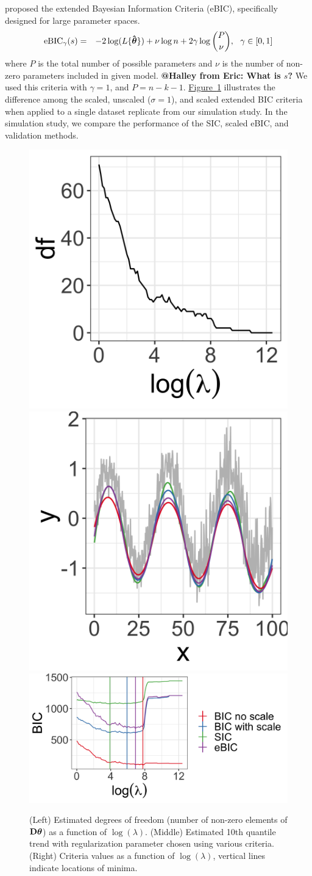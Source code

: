 \documentclass[12pt]{article}
\makeatletter
\newcommand{\Halley}[2]{{\bf {\color{purple}@Halley from #1: #2}}\xspace}
\newcommand{\Fig}[1]{\hyperref[fig:#1]{Figure~\ref*{fig:#1}}} %
\newcommand{\Fig}[1]{{Figure~\ref{fig:#1}}} %
\newcommand{\V}[1]{{\bm{\mathbf{\MakeLowercase{#1}}}}} %
\newcommand{\Vhat}[1]{{\bm{\hat \mathbf{\MakeLowercase{#1}}}}} %
\newcommand{\M}[1]{{\bm{\mathbf{\MakeUppercase{#1}}}}} %
\makeatother
\begin{document}
	\cite{chen2008} proposed the extended Bayesian Information Criteria (eBIC), specifically designed for large parameter spaces.
	\begin{eqnarray*}
	\label{eq:eBIC}
	\mbox{eBIC}_{\gamma}(s) & = & -2\log(L\{\Vhat{\theta}\}) + \nu\log n  + 2\gamma\log{P \choose \nu},~~\gamma \in [0,1]
	\end{eqnarray*}
	where $P$ is the total number of possible parameters and $\nu$ is the number of non-zero parameters included in given model. \Halley{Eric}{What is $s$?} We used this criteria with $\gamma = 1$, and $P=n-k-1$. \Fig{BIC} illustrates the difference among the scaled, unscaled ($\sigma = 1$), and scaled extended BIC criteria
	when applied to a single dataset replicate from our simulation study. In the simulation study, we compare the performance of the SIC, scaled eBIC, and validation methods.

	\begin{figure}[h!]
		\includegraphics[width = 0.25\linewidth]{Figures/df_by_lambda.png}
		\includegraphics[width = 0.25\linewidth]{Figures/BIC_data.png}
		\includegraphics[width = 0.5\linewidth]{Figures/BIC_by_lambda.png}
		\caption{(Left) Estimated degrees of freedom (number of non-zero elements of $\M{D}\V{\theta}$) as a function of $\log(\lambda)$. (Middle) Estimated 10th quantile trend with regularization parameter chosen using various criteria. (Right) Criteria values as a function of $\log(\lambda)$, vertical lines indicate locations of minima.}
		\label{fig:BIC}
	\end{figure}
\end{document}
